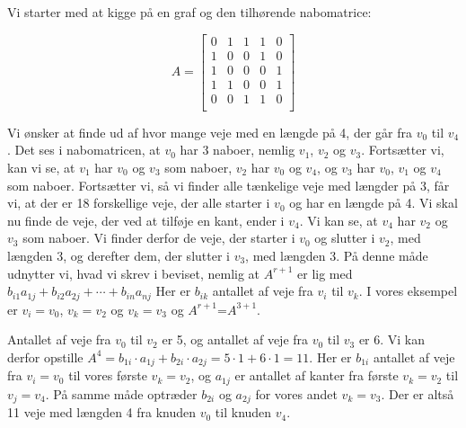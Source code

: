 \begin{exmp}
Vi starter med at kigge på en graf og den tilhørende nabomatrice:


\begin{equation}
A=\begin{bmatrix}
    0&1&1&1&0\\
    1&0&0&1&0\\
    1&0&0&0&1\\
    1&1&0&0&1\\
    0&0&1&1&0\\
\end{bmatrix}
\end{equation}


Vi ønsker at finde ud af hvor mange veje med en længde på 4, der går fra $v_0$ til $v_4$. Det ses i nabomatricen, at $v_0$ har 3 naboer, nemlig $v_1$, $v_2$ og $v_3$. Fortsætter vi, kan vi se, at $v_1$ har $v_0$ og $v_3$ som naboer, $v_2$ har $v_0$ og $v_4$, og $v_3$ har $v_0$, $v_1$ og $v_4$ som naboer. Fortsætter vi, så vi finder alle tænkelige veje med længder på 3, får vi, at der er 18 forskellige veje, der alle starter i $v_0$ og har en længde på 4. Vi skal nu finde de veje, der ved at tilføje en kant, ender i $v_4$. Vi kan se, at $v_4$ har $v_2$ og $v_3$ som naboer. Vi finder derfor de veje, der starter i $v_0$ og slutter i $v_2$, med længden 3, og derefter dem, der slutter i $v_3$, med længden 3. På denne måde udnytter vi, hvad vi skrev i beviset, nemlig at
\textbf{$A^{r+1}$} er lig med $b_{i1}a_{1j} + b_{i2}a_{2j} +\cdots+ b_{in}a_{nj}$
Her er $b_{ik}$ antallet af veje fra $v_{i}$ til ${v_k}$. I vores eksempel er $v_{i}=v_{0}$, ${v_k}=v_{2}$ og ${v_k}=v_{3}$ og \textbf{$A^{r+1}$}=\textbf{$A^{3+1}$}. 
 


Antallet af veje fra $v_{0}$ til $v_{2}$ er 5, og antallet af veje fra $v_{0}$ til $v_{3}$ er 6. Vi kan derfor opstille
\textbf{$A^{4}$}$=b_{1i} \cdot a_{1j}+b_{2i} \cdot a_{2j}=5 \cdot 1+6 \cdot 1=11$.
Her er $b_{1i}$ antallet af veje fra $v_{i}=v_{0}$ til vores første $v_{k}=v_{2}$, og $a_{1j}$ er antallet af kanter fra første $v_{k}=v_{2}$ til  $v_{j}=v_{4}$. På samme måde optræder $b_{2i}$ og $a_{2j}$ for vores andet $v_{k}=v_{3}$. Der er altså 11 veje med længden 4 fra knuden $v_{0}$ til knuden $v_{4}$.

\end{exmp}

